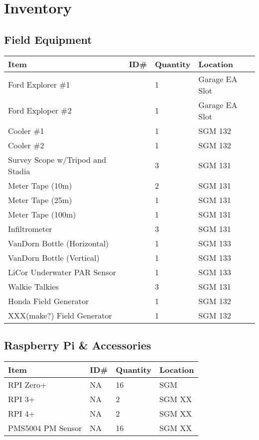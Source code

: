 \documentclass[12pt]{../SOP4_alpha}\usepackage[]{graphicx}\usepackage[]{color}
\begin{document}


\section{Inventory}

\subsection{Field Equipment}

\begin{tabular}{|l|l|l|l|}
\hline
Item      & ID\#  & Quantity & Location \\ \hline
Ford Explorer \#1 && 1 & Garage EA Slot \\
Ford Exploper \#2  && 1 & Garage EA Slot \\
Cooler \#1        && 1 & SGM 132 \\
Cooler \#2        && 1 & SGM 132 \\
Survey Scope w/Tripod and Stadia  && 3 & SGM 131 \\
Meter Tape (10m)  && 2 & SGM 131 \\
Meter Tape (25m)  && 1 & SGM 131 \\
Meter Tape (100m) && 1 & SGM 131 \\
Infiltrometer     && 3 & SGM 131 \\
VanDorn Bottle (Horizontal) && 1 & SGM 133 \\
VanDorn Bottle (Vertical) && 1 & SGM 133 \\
LiCor Underwater PAR Sensor  && 1 & SGM 133 \\

Walkie Talkies && 3 & SGM 131 \\
Honda Field Generator  && 1 & SGM 132 \\
XXX(make?) Field Generator && 1 & SGM 132 \\
\hline
\end{tabular}

\subsection{Raspberry Pi \& Accessories}

\begin{tabular}{|l|l|l|l|}
\hline
Item        & ID\#  & Quantity  & Location \\ \hline
RPI Zero+   & NA    & 16        & SGM \\
RPI 3+      & NA    & 2         & SGM XX \\
RPI 4+      & NA    & 2         & SGM XX \\
PMS5004 PM Sensor & NA & 16     & SGM XX \\
\hline
\end{tabular}
\end{document}
